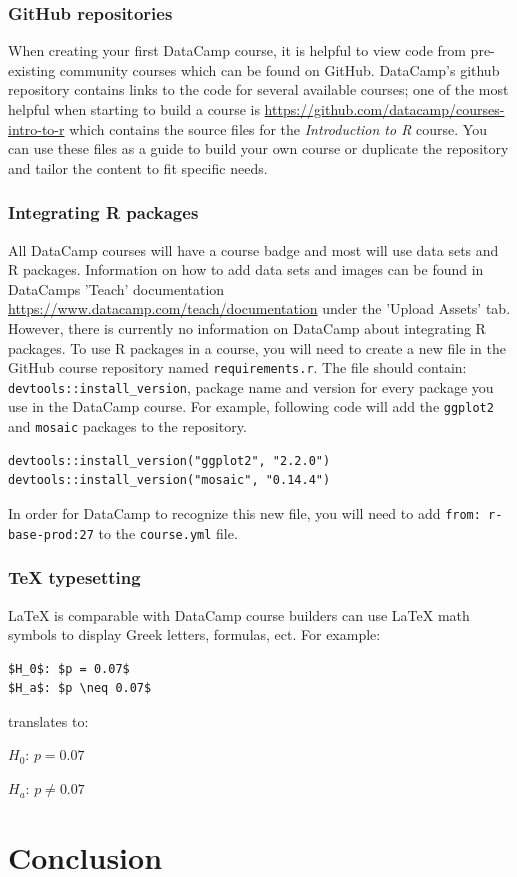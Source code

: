\documentclass[12pt]{article}\usepackage[]{graphicx}\usepackage[]{color}
\begin{document}
\subsubsection{GitHub repositories}
When creating your first DataCamp course, it is helpful to view code from pre-existing community courses which can be found on GitHub.
DataCamp's github repository contains links to the code for several available courses; one of the most helpful when starting to build a course 
is \url{https://github.com/datacamp/courses-intro-to-r} which contains the source files for the \textit{Introduction to R} course.
You can use these files as a guide to build your own course or duplicate the repository and tailor the content to fit specific needs.

\subsubsection{Integrating R packages}
All DataCamp courses will have a course badge and most will use data sets and R packages. Information on how to add data sets and images
can be found in DataCamps 'Teach' documentation \url{https://www.datacamp.com/teach/documentation} under the 'Upload Assets' tab. However,
there is currently no information on DataCamp about integrating R packages. To use R packages in a course, you will need to create a new file
in the GitHub course repository named \texttt{requirements.r}. The file should contain: \texttt{devtools::install\_version}, package name and version for 
every package you use in the DataCamp course. For example, following code will add the \texttt{ggplot2} and \texttt{mosaic} packages to the repository.

\begin{verbatim}
devtools::install_version("ggplot2", "2.2.0")
devtools::install_version("mosaic", "0.14.4")
\end{verbatim}
In order for DataCamp to recognize this new file, you will need to add \texttt{from: r-base-prod:27} to the \texttt{course.yml} file.

\subsubsection{TeX typesetting}
LaTeX is comparable with DataCamp course builders can use LaTeX math symbols to display Greek letters, formulas, ect. For example:
\begin{verbatim}
$H_0$: $p = 0.07$
$H_a$: $p \neq 0.07$
\end{verbatim}

translates to:

$H_0$: $p = 0.07$

$H_a$: $p \neq 0.07$

\section{Conclusion}



\end{document}
